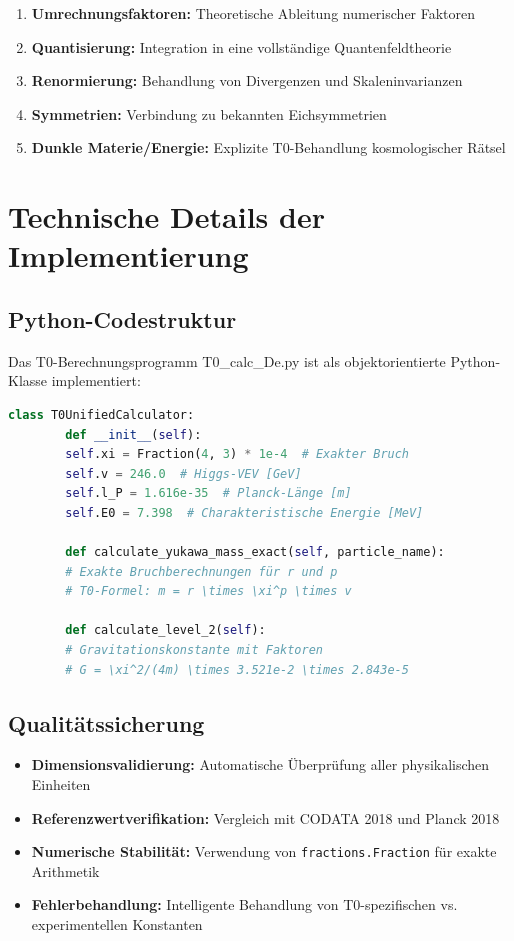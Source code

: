\documentclass[12pt,a4paper]{report}
\begin{document}
	\begin{enumerate}
		\item \textbf{Umrechnungsfaktoren:} Theoretische Ableitung numerischer Faktoren
		\item \textbf{Quantisierung:} Integration in eine vollständige Quantenfeldtheorie
		\item \textbf{Renormierung:} Behandlung von Divergenzen und Skaleninvarianzen
		\item \textbf{Symmetrien:} Verbindung zu bekannten Eichsymmetrien
		\item \textbf{Dunkle Materie/Energie:} Explizite T0-Behandlung kosmologischer Rätsel
	\end{enumerate}
	
	\section{Technische Details der Implementierung}
	
	\subsection{Python-Codestruktur}
	
	Das T0-Berechnungsprogramm T0\_calc\_De.py ist als objektorientierte Python-Klasse implementiert:
	
	\begin{lstlisting}[language=Python, basicstyle=\small\ttfamily]
		class T0UnifiedCalculator:
		def __init__(self):
		self.xi = Fraction(4, 3) * 1e-4  # Exakter Bruch
		self.v = 246.0  # Higgs-VEV [GeV]
		self.l_P = 1.616e-35  # Planck-Länge [m]
		self.E0 = 7.398  # Charakteristische Energie [MeV]
		
		def calculate_yukawa_mass_exact(self, particle_name):
		# Exakte Bruchberechnungen für r und p
		# T0-Formel: m = r \times \xi^p \times v
		
		def calculate_level_2(self):
		# Gravitationskonstante mit Faktoren
		# G = \xi^2/(4m) \times 3.521e-2 \times 2.843e-5
	\end{lstlisting}
	
	\subsection{Qualitätssicherung}
	
	\begin{itemize}
		\item \textbf{Dimensionsvalidierung:} Automatische Überprüfung aller physikalischen Einheiten
		\item \textbf{Referenzwertverifikation:} Vergleich mit CODATA 2018 und Planck 2018
		\item \textbf{Numerische Stabilität:} Verwendung von \texttt{fractions.Fraction} für exakte Arithmetik
		\item \textbf{Fehlerbehandlung:} Intelligente Behandlung von T0-spezifischen vs. experimentellen Konstanten
	\end{itemize}
	
\end{document}
